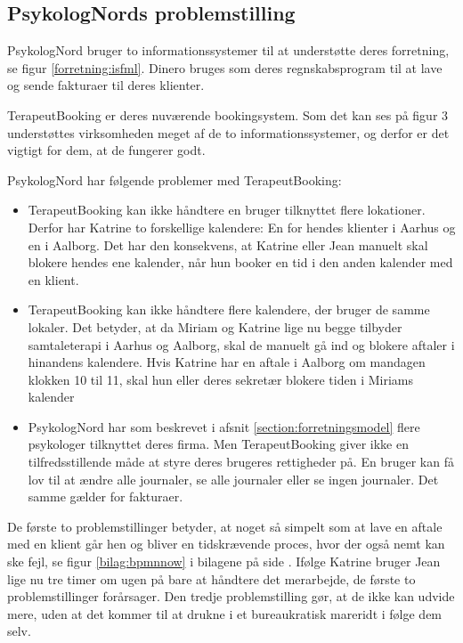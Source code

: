 \subsection{PsykologNords problemstilling}
\label{section:problemstilling}

PsykologNord bruger to informationssystemer til at understøtte deres forretning, se figur \ref{forretning:isfml}.
Dinero bruges som deres regnskabsprogram til at lave og sende fakturaer til deres klienter.

TerapeutBooking er deres nuværende bookingsystem.
Som det kan ses på figur 3 understøttes virksomheden meget af de to informationssystemer, og derfor er det vigtigt for dem, at de fungerer godt.

PsykologNord har følgende problemer med TerapeutBooking:

\begin{itemize}
    \item TerapeutBooking kan ikke håndtere en bruger tilknyttet flere lokationer.
    Derfor har Katrine to forskellige kalendere: En for hendes klienter i Aarhus og en i Aalborg.
    Det har den konsekvens, at Katrine eller Jean manuelt skal blokere hendes ene kalender, når hun booker en tid i den anden kalender med en klient.
    
    \item TerapeutBooking kan ikke håndtere flere kalendere, der bruger de samme lokaler.
    Det betyder, at da Miriam og Katrine lige nu begge tilbyder samtaleterapi i Aarhus og Aalborg, skal de manuelt gå ind og blokere aftaler i hinandens kalendere.
    Hvis Katrine har en aftale i Aalborg om mandagen klokken 10 til 11, skal hun eller deres sekretær blokere tiden i Miriams kalender
    
   \item PsykologNord har som beskrevet i afsnit \ref{section:forretningsmodel} flere psykologer tilknyttet deres firma.
   Men TerapeutBooking giver ikke en tilfredsstillende måde at styre deres brugeres rettigheder på.
   En bruger kan få lov til at ændre alle journaler, se alle journaler eller se ingen journaler.
   Det samme gælder for fakturaer.
\end{itemize}

De første to problemstillinger betyder, at noget så simpelt som at lave en aftale med en klient går hen og bliver en tidskrævende proces, hvor der også nemt kan ske fejl, se figur \ref{bilag:bpmnnow} i bilagene på side \pageref{bilag:bpmnnow}.
Ifølge Katrine bruger Jean lige nu tre timer om ugen på bare at håndtere det merarbejde, de første to problemstillinger forårsager.
Den tredje problemstilling gør, at de ikke kan udvide mere, uden at det kommer til at drukne i et bureaukratisk mareridt i følge dem selv.

